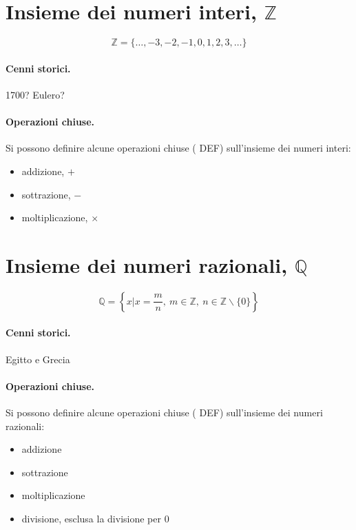 \section{Insieme dei numeri interi, $\mathbb{Z}$}
\begin{equation}
    \mathbb{Z} = \{ \dots, -3, -2, -1, 0, 1, 2, 3, \dots \}
\end{equation}
\paragraph{Cenni storici.}
{\color{red} 1700? Eulero?}
\paragraph{Operazioni chiuse.}
Si possono definire alcune operazioni chiuse ({\color{red} DEF}) sull'insieme dei numeri interi:
\begin{itemize}
    \item addizione, $+$
    \item sottrazione, $-$
    \item moltiplicazione, $\times$
\end{itemize}

\section{Insieme dei numeri razionali, $\mathbb{Q}$}
\begin{equation}
    \mathbb{Q} = \left\{ x \big| x = \dfrac{m}{n}, \ m \in \mathbb{Z}, \ n \in \mathbb{Z}\backslash\{0\} \right\}
\end{equation}

\paragraph{Cenni storici.}
{\color{red} Egitto e Grecia}

\paragraph{Operazioni chiuse.}
Si possono definire alcune operazioni chiuse ({\color{red} DEF}) sull'insieme dei numeri razionali:
\begin{itemize}
    \item addizione
    \item sottrazione
    \item moltiplicazione
    \item divisione, esclusa la divisione per $0$
\end{itemize}

